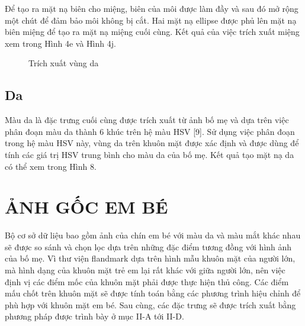 \documentclass[journal]{IEEEtran}
\begin{document}
Để tạo ra mặt nạ biên cho miệng, biên của môi được làm đầy và sau đó mở rộng một chút để đảm bảo môi không bị cắt. Hai mặt nạ ellipse được phủ lên mặt nạ biên miệng để tạo ra mặt nạ miệng cuối cùng. Kết quả của việc trích xuất miệng xem trong Hình 4e và Hình 4j.


\begin{figure}[!t]
\centering
{}
\caption{Trích xuất vùng da}
\label{refhinh8}
\end{figure}

\subsection{Da}
Màu da là đặc trưng cuối cùng được trích xuất từ ảnh bố mẹ và dựa trên việc phân đoạn màu da thành 6 khúc trên hệ màu HSV [9]. Sử dụng việc phân đoạn trong hệ màu HSV này, vùng da trên khuôn mặt được xác định và được dùng để tính các giá trị HSV trung bình cho màu da của bố mẹ. Kết quả tạo mặt nạ da có thể xem trong Hình 8.



\section{ẢNH GỐC EM BÉ}
Bộ cơ sở dữ liệu bao gồm ảnh của chín em bé với màu da và màu mắt khác nhau sẽ được so sánh và chọn lọc dựa trên những đặc điểm tương đồng với hình ảnh của bố mẹ. Vì thư viện flandmark dựa trên hình mẫu khuôn mặt của người lớn, mà hình dạng của khuôn mặt trẻ em lại rất khác với giữa người lớn, nên việc định vị các điểm mốc của khuôn mặt phải được thực hiện thủ công. Các điểm mấu chốt trên khuôn mặt sẽ được tính toán bằng các phương trình hiệu chỉnh để phù hợp với khuôn mặt em bé. Sau cùng, các đặc trưng sẽ được trích xuất bằng phương pháp được trình bày ở mục II-A tới II-D. 
\end{document}
